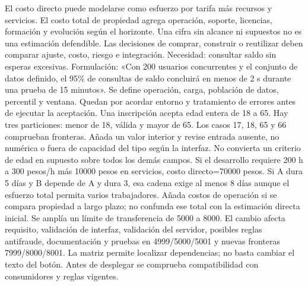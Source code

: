 El costo directo puede modelarse como esfuerzo por tarifa más recursos y servicios. El costo total de propiedad agrega operación, soporte, licencias, formación y evolución según el horizonte. Una cifra sin alcance ni supuestos no es una estimación defendible. Las decisiones de comprar, construir o reutilizar deben comparar ajuste, costo, riesgo e integración.
Necesidad: consultar saldo sin esperas excesivas. Formulación: «Con 200 usuarios concurrentes y el conjunto de datos definido, el 95\% de consultas de saldo concluirá en menos de 2 s durante una prueba de 15 minutos». Se define operación, carga, población de datos, percentil y ventana. Quedan por acordar entorno y tratamiento de errores antes de ejecutar la aceptación.
Una inscripción acepta edad entera de 18 a 65. Hay tres particiones: menor de 18, válida y mayor de 65. Los casos 17, 18, 65 y 66 comprueban fronteras. Añada un valor interior y revise entrada ausente, no numérica o fuera de capacidad del tipo según la interfaz. No convierta un criterio de edad en supuesto sobre todos los demás campos.
Si el desarrollo requiere 200 h a 300 pesos/h más 10000 pesos en servicios, costo directo=70000 pesos. Si A dura 5 días y B depende de A y dura 3, esa cadena exige al menos 8 días aunque el esfuerzo total permita varios trabajadores. Añada costos de operación si se compara propiedad a largo plazo; no confunda ese total con la estimación directa inicial.
Se amplía un límite de transferencia de 5000 a 8000. El cambio afecta requisito, validación de interfaz, validación del servidor, posibles reglas antifraude, documentación y pruebas en 4999/5000/5001 y nuevas fronteras 7999/8000/8001. La matriz permite localizar dependencias; no basta cambiar el texto del botón. Antes de desplegar se comprueba compatibilidad con consumidores y reglas vigentes.

